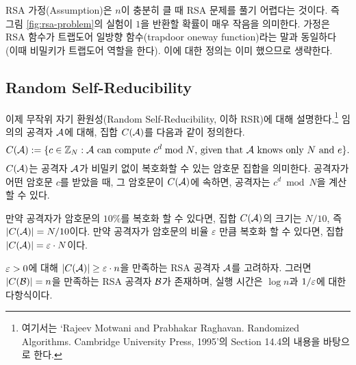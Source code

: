 RSA 가정(Assumption)은 $n$이 충분히 클 때 RSA 문제를 풀기 어렵다는 것이다. 즉
그림 \ref{fig:rsa-problem}의 실험이 $1$을 반환할 확률이 매우 작음을 의미한다.
가정은 RSA 함수가 트랩도어 일방향 함수(trapdoor oneway function)라는 말과
동일하다 (이때 비밀키가 트랩도어 역할을 한다). 이에 대한 정의는 이미 했으므로
생략한다.

\subsection{Random Self-Reducibility}

이제 무작위 자기 환원성(Random Self-Reducibility, 이하 RSR)에 대해
설명한다.\footnote{여기서는 `Rajeev Motwani and Prabhakar Raghavan. Randomized
Algorithms. Cambridge University Press, 1995'의 Section 14.4의 내용을 바탕으로
한다.} 임의의 공격자 $\mathcal{A}$에 대해, 집합 $C(\mathcal{A})$를 다음과 같이 정의한다.
$$
    C(\mathcal{A}) := \{ c \in \mathbb{Z}_N : \mathcal{A} \text{ can compute $c^d \bmod N$, given that $\mathcal{A}$ knows only $N$ and $e$} \}.
$$
$C(\mathcal{A})$는 공격자 $\mathcal{A}$가 비밀키 없이 복호화할 수 있는 암호문 집합을 의미한다.
공격자가 어떤 암호문 $c$를 받았을 때, 그 암호문이 $C(\mathcal{A})$에 속하면, 공격자는
$c^d \bmod N$을 계산할 수 있다.

만약 공격자가 암호문의 $10\%$를 복호화 할 수 있다면, 집합 $C(\mathcal{A})$의 크기는
$N/10$, 즉 $|C(\mathcal{A})| = N/10$이다. 만약 공격자가 암호문의 비율 $\varepsilon$ 만큼
복호화 할 수 있다면, 집합 $|C(\mathcal{A})| = \varepsilon \cdot N$이다.

\begin{tcolorbox}[colback=white, boxrule=0.7pt, sharp corners] 
    \begin{theorem}
        $\varepsilon > 0$에 대해 $|C(\mathcal{A})| \geq \varepsilon \cdot n$을 만족하는 RSA 공격자
        $\mathcal{A}$를 고려하자. 그러면 $|C(\mathcal{B})| = n$을 만족하는 RSA 공격자 $\mathcal{B}$가
        존재하며, 실행 시간은 $\log n$과 $1/\varepsilon$에 대한 다항식이다.
    \end{theorem}
\end{tcolorbox}

